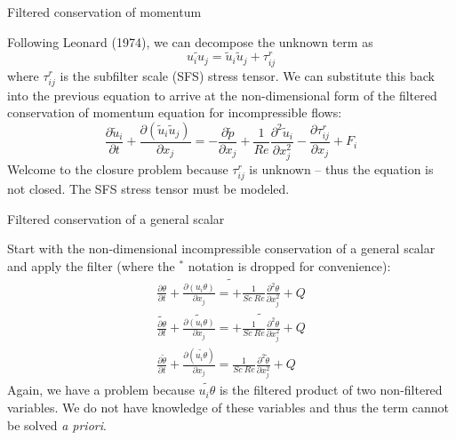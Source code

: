 \begin{frame}{Filtered conservation of momentum}

Following Leonard (1974), we can decompose the unknown term as
$$\widetilde{u_i u_j} = \tilde u_i \tilde u_j + \tau_{ij}^r$$
where $\tau_{ij}^r$ is the subfilter scale (SFS) stress tensor. 
\newline\newline We can substitute this back into the previous equation to arrive at the non-dimensional form of the filtered conservation of momentum equation for incompressible flows:
$$\boxed{\frac{\partial \tilde u_i}{\partial t} + \frac{\partial (\tilde u_i \tilde u_j)}{\partial x_j} = - \frac{\partial \tilde p}{\partial x_j} + \frac{1}{Re} \frac{\partial^2 \tilde u_i}{\partial x_j^{2}} -\frac{\partial \tau_{ij}^r}{\partial x_j}+ F_i}$$
Welcome to the closure problem because $\tau_{ij}^r$ is unknown -- thus the equation is not closed. The SFS stress tensor must be modeled.
\end{frame}


\begin{frame}{Filtered conservation of a general scalar}

Start with the non-dimensional incompressible conservation of a general scalar and apply the filter (where the $^*$ notation is dropped for convenience):
\begin{gather*}
\widetilde{\frac{\partial \theta}{\partial t} + \frac{\partial (u_i \theta)}{\partial x_j} = + \frac{1}{Sc\ Re} \frac{\partial^2 \theta}{\partial x_j^{2}} + Q}\\
\widetilde{\frac{\partial \theta}{\partial t}} + \widetilde{\frac{\partial (u_i \theta)}{\partial x_j}} = + \widetilde{\frac{1}{Sc\ Re} \frac{\partial^2 \theta}{\partial x_j^{2}}} + Q\\
\frac{\partial \tilde \theta}{\partial t} + \frac{\partial (\widetilde{u_i \theta})}{\partial x_j} = \frac{1}{Sc\ Re} \frac{\partial^2 \tilde \theta}{\partial x_j^{2}} + Q
\end{gather*}
Again, we have a problem because $\widetilde{u_i \theta}$ is the filtered product of two non-filtered variables. We do not have knowledge of these variables and thus the term cannot be solved \textit{a priori}.
\end{frame}


